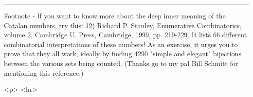 \par\noindent\rule{\textwidth}{0.4pt}
Footnote - If you want to know more about the deep inner meaning
of the Catalan numbers, try this:
12) Richard P. Stanley, Enumerative Combinatorics, volume 2,
Cambridge U. Press, Cambridge, 1999, pp. 219-229.
It lists 66 different combinatorial interpretations of these
numbers!  As an exercise, it urges you to prove that they all
work, ideally by finding 4290 "simple and elegant" bijections
between the various sets being counted.  
(Thanks go to my pal Bill Schmitt for mentioning this reference.)





<p> <hr>



